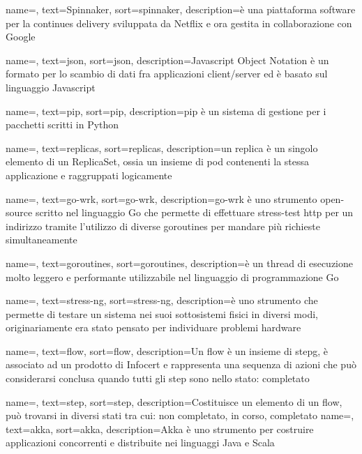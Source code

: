 {
    name=,
    text=Spinnaker,
    sort=spinnaker,
    description={è una piattaforma software per la continues delivery sviluppata da Netflix e ora gestita in collaborazione con Google}
}

{
    name=,
    text=json,
    sort=json,
    description={Javascript Object Notation è un formato per lo scambio di dati fra applicazioni client/server ed è basato sul linguaggio Javascript}
}

{
    name=,
    text=pip,
    sort=pip,
    description={pip è un sistema di gestione per i pacchetti scritti in Python}
}

{
    name=,
    text=replicas,
    sort=replicas,
    description={un replica è un singolo elemento di un ReplicaSet, ossia un insieme di pod contenenti la stessa applicazione e raggruppati logicamente}
}

{
    name=,
    text=go-wrk,
    sort=go-wrk,
    description={go-wrk è uno strumento open-source scritto nel linguaggio Go che permette di effettuare stress-test http per un indirizzo tramite l'utilizzo di diverse goroutines per mandare più richieste simultaneamente}
}

{
    name=,
    text=goroutines,
    sort=goroutines,
    description={è un thread di esecuzione molto leggero e performante utilizzabile nel linguaggio di programmazione Go}
}

{
    name=,
    text=stress-ng,
    sort=stress-ng,
    description={è uno strumento che permette di testare un sistema nei suoi sottosistemi fisici in diversi modi, originariamente era stato pensato per individuare problemi hardware}
}

{
    name=,
    text=flow,
    sort=flow,
    description={Un flow è un insieme di \gls{stepg}, è associato ad un prodotto di Infocert e rappresenta una sequenza di azioni che può considerarsi conclusa quando tutti gli step sono nello stato: completato}
}

{
    name=,
    text=step,
    sort=step,
    description={Costituisce un elemento di un flow, può trovarsi in diversi stati tra cui: non completato, in corso, completato}
}
{
    name=,
    text=akka,
    sort=akka,
    description={Akka è uno strumento per costruire applicazioni concorrenti e distribuite nei linguaggi Java e Scala}
}